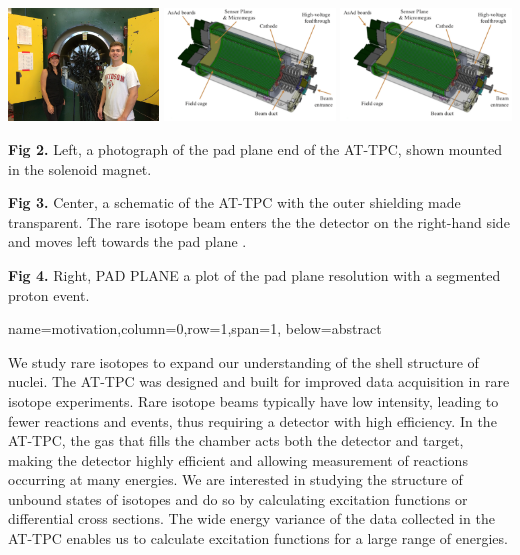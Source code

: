 \documentclass[ansiepaperDNP,portrait]{baposter}
\begin{document}
\begin{poster}
{\begin{center}
\includegraphics [height=30mm]{michigan_trip.jpg} 
\hspace{0.2cm}
\includegraphics [height=30mm] {attpc.png}
\hspace{0.2cm}
\includegraphics [height=30mm] {attpc.png}
\end{center}


\small{\textbf{Fig 2.} Left, a photograph of the pad plane end of the AT-TPC, shown mounted in the solenoid magnet.}

\small{\textbf{Fig 3.} Center, a schematic of the AT-TPC with the outer shielding made transparent. The rare isotope beam enters the the detector on the right-hand side and moves left towards the pad plane \cite{Bradt-thesis}.}

\small{\textbf{Fig 4.} Right, PAD PLANE a plot of the pad plane resolution with a segmented proton event.}

}
{name=motivation,column=0,row=1,span=1, below=abstract}
{\small{We study rare isotopes to expand our understanding of the shell structure of nuclei. The AT-TPC was designed and built for improved data acquisition in rare isotope experiments. Rare isotope beams typically have low intensity, leading to fewer reactions and events, thus requiring a detector with high efficiency. In the AT-TPC, the gas that fills the chamber acts both the detector and target, making the detector highly efficient and allowing measurement of reactions occurring at many energies. We are interested in studying the structure of unbound states of isotopes and do so by calculating excitation functions or differential cross sections. The wide energy variance of the data collected in the AT-TPC enables us to calculate excitation functions for a large range of energies.

}}
\end{poster}
\end{document}
